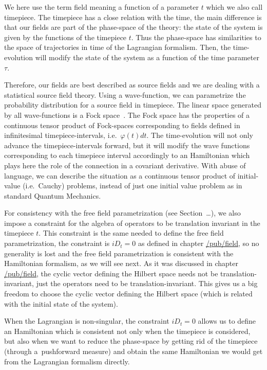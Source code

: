 \documentclass[11pt]{book}
\begin{document}
We here use the term field meaning a function of a parameter \(t\) which
we also call timepiece. The timepiece has a close relation with the
time, the main difference is that our fields are part of the phase-space
of the theory: the state of the system is given by the functions of the
timepiece \(t\). Thus the phase-space has similarities to the space of
trajectories in time of the Lagrangian formalism. Then, the
time-evolution will modify the state of the system as a function of the
time parameter \(\tau\).

Therefore, our fields are best described as source fields and we are
dealing with a statistical source field theory. Using a wave-function,
we can parametrize the probability distribution for a source field in
timepiece. The linear space generated by all wave-functions is a Fock
space~\cite{Manton2015primer}. The Fock space has the properties of a continuous tensor product
of Fock-spaces corresponding to fields defined in infinitesimal
timepiece-intervals, i.e.~\(\varphi(t)dt\). The time-evolution will not
only advance the timepiece-intervals forward, but it will modify the
wave functions corresponding to each timepiece interval accordingly to
an Hamiltonian which plays here the role of the connection in a
covariant derivative. With abuse of language, we can describe the
situation as a continuous tensor product of initial-value (i.e.~Cauchy)
problems, instead of just one initial value problem as in standard
Quantum Mechanics.

For consistency with the free field parametrization (see
Section~\ldots), we also impose a constraint for the algebra of
operators to be translation invariant in the timepiece \(t\). This
constraint is the same needed to define the free field parametrization,
the constraint is \(iD_t=0\) as defined in chapter
\href{https://timepiece.pubpub.org/pub/field}{/pub/field}, so no
generality is lost and the free field parametrization is consistent with
the Hamiltonian formalism, as we will see next. As it was discussed in
chapter \href{https://timepiece.pubpub.org/pub/field}{/pub/field}, the
cyclic vector defining the Hilbert space needs not be
translation-invariant, just the operators need to be
translation-invariant. This gives us a big freedom to choose the cyclic
vector defining the Hilbert space (which is related with the initial
state of the system).

When the Lagrangian is non-singular, the constraint \(iD_t=0\) allows us
to define an Hamiltonian which is consistent not only when the timepiece
is considered, but also when we want to reduce the phase-space by
getting rid of the timepiece (through a~pushforward measure) and obtain
the same Hamiltonian we would get from the Lagrangian formalism
directly.
\end{document}
